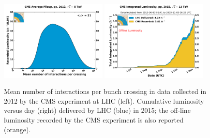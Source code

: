 \begin{figure}[h]
 \begin{center}
   \includegraphics[width=0.48\textwidth]{chapters/Chapter2-CMSatLHC/Figures/pileup_pp_2012.png}
  \includegraphics[width=0.48\textwidth]{chapters/Chapter2-CMSatLHC/Figures/int_lumi_per_day_cumulative_pp_2015.png}
 \end{center}
 \caption{Mean number of interactions per bunch crossing in data collected in 2012 by the CMS experiment at LHC (left). Cumulative luminosity versus day (right) delivered by LHC (blue) in 2015; the off-line luminosity recorded by the CMS experiment is also reported (orange).~\cite{LumiPublicResults}}
 \label{fig:LHClumiAndPU}
\end{figure}

